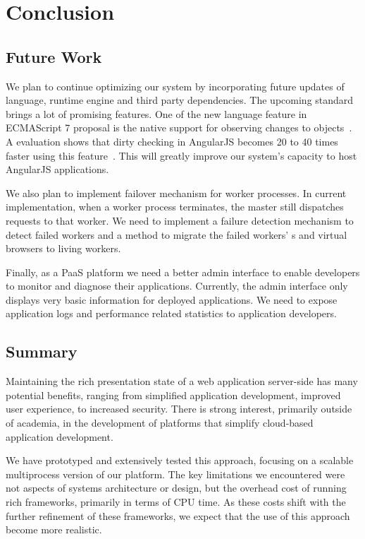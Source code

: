 \chapter{Conclusion}

\section{Future Work}

We plan to continue optimizing our system by incorporating future updates of
\js language, \js runtime engine and third party dependencies. The upcoming
\js standard brings a lot of promising features.  One of the new language
feature in ECMAScript 7 proposal is the native support for observing changes
to objects~\cite{jsobserveprop}. A evaluation shows that dirty checking in
AngularJS becomes 20 to 40 times faster using this
feature~\cite{angularjsspeedup}. This will greatly improve our system's
capacity to host AngularJS applications.



We also plan to implement failover mechanism for   worker processes.  In
current implementation, when a worker process terminates,  the master still
dispatches requests to that worker. We need to implement a failure detection
mechanism to detect failed workers and a method to migrate the failed workers'
\appins{}s and virtual browsers to living workers.


Finally, as a PaaS platform we need a better admin interface 
to enable developers to monitor and diagnose their applications.
Currently, the admin interface only displays very basic information for deployed 
applications. We need to expose application logs 
and performance related statistics to application developers.

\section{Summary}

Maintaining the rich presentation state  of a web application server-side has
many potential benefits, ranging from simplified application development,
improved user experience, to increased security.  There is strong interest,
primarily outside of academia, in the development of platforms that simplify
cloud-based  application development.

We have prototyped and extensively tested this approach, focusing on a
scalable multiprocess version of our \cb{} platform. The key limitations we
encountered were not aspects of systems architecture or design,  but the
overhead cost of running rich frameworks, primarily in terms of CPU time.   As
these costs shift with the further refinement of these frameworks, we expect
that the use of this approach become more realistic.
